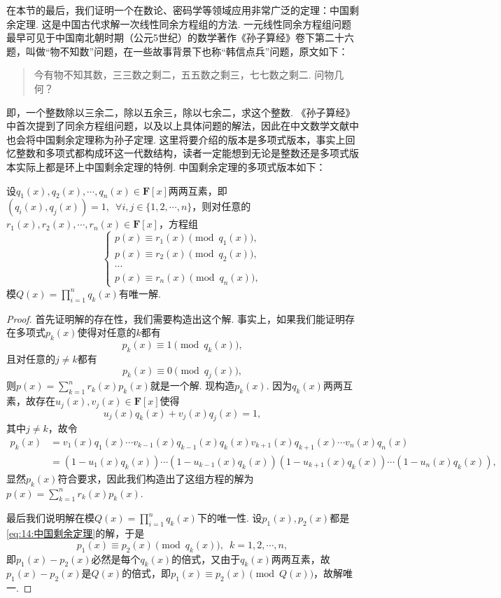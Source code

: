 在本节的最后，我们证明一个在数论、密码学等领域应用非常广泛的定理：中国剩余定理. 这是中国古代求解一次线性同余方程组的方法. 一元线性同余方程组问题最早可见于中国南北朝时期（公元5世纪）的数学著作《孙子算经》卷下第二十六题，叫做``物不知数''问题，在一些故事背景下也称``韩信点兵''问题，原文如下：
\begin{quotation}
    \kaishu
    今有物不知其数，三三数之剩二，五五数之剩三，七七数之剩二. 问物几何？
\end{quotation}
即，一个整数除以三余二，除以五余三，除以七余二，求这个整数. 《孙子算经》中首次提到了同余方程组问题，以及以上具体问题的解法，因此在中文数学文献中也会将中国剩余定理称为孙子定理. 这里将要介绍的版本是多项式版本，事实上回忆整数和多项式都构成环这一代数结构，读者一定能想到无论是整数还是多项式版本实际上都是环上中国剩余定理的特例. 中国剩余定理的多项式版本如下：
\begin{theorem}[中国剩余定理] \label{thm:14:中国剩余定理}
    设$q_1(x),q_2(x),\cdots,q_n(x)\in\mathbf{F}[x]$两两互素，即$(q_i(x),q_j(x))=1,\enspace\forall i,j\in\{1,2,\cdots,n\}$，则对任意的$r_1(x),r_2(x),\cdots,r_n(x)\in\mathbf{F}[x]$，方程组
    \begin{equation} \label{eq:14:中国剩余定理}
        \begin{cases}
            p(x)\equiv r_1(x)\pmod{q_1(x)},\\
            p(x)\equiv r_2(x)\pmod{q_2(x)},\\
            \cdots\\
            p(x)\equiv r_n(x)\pmod{q_n(x)},
        \end{cases}
    \end{equation}
    模$Q(x)=\prod\limits_{i=1}^nq_k(x)$有唯一解.
\end{theorem}
\begin{proof}
    首先证明解的存在性，我们需要构造出这个解. 事实上，如果我们能证明存在多项式$p_k(x)$使得对任意的$k$都有
    \[p_k(x)\equiv 1\pmod{q_k(x)},\]
    且对任意的$j\neq k$都有
    \[p_k(x)\equiv 0\pmod{q_j(x)},\]
    则$p(x)=\sum\limits_{k=1}^nr_k(x)p_k(x)$就是一个解. 现构造$p_k(x)$. 因为$q_k(x)$两两互素，故存在$u_j(x),v_j(x)\in\mathbf{F}[x]$使得
    \[u_j(x)q_k(x)+v_j(x)q_j(x)=1,\]
    其中$j\neq k$，故令
    \begin{align*}
        p_k(x)&=v_1(x)q_1(x)\cdots v_{k-1}(x)q_{k-1}(x)q_k(x)v_{k+1}(x)q_{k+1}(x)\cdots v_n(x)q_n(x) \\
                &=(1-u_1(x)q_k(x))\cdots(1-u_{k-1}(x)q_k(x))(1-u_{k+1}(x)q_k(x))\cdots(1-u_n(x)q_k(x)),
    \end{align*}
    显然$p_k(x)$符合要求，因此我们构造出了这组方程的解为$p(x)=\sum\limits_{k=1}^nr_k(x)p_k(x)$.

    最后我们说明解在模$Q(x)=\prod\limits_{i=1}^nq_k(x)$下的唯一性. 设$p_1(x),p_2(x)$都是\autoref{eq:14:中国剩余定理}的解，于是
    \[p_1(x)\equiv p_2(x)\pmod{q_k(x)},\enspace k=1,2,\cdots,n,\]
    即$p_1(x)-p_2(x)$必然是每个$q_k(x)$的倍式，又由于$q_k(x)$两两互素，故$p_1(x)-p_2(x)$是$Q(x)$的倍式，即$p_1(x)\equiv p_2(x)\pmod{Q(x)}$，故解唯一.
\end{proof}

